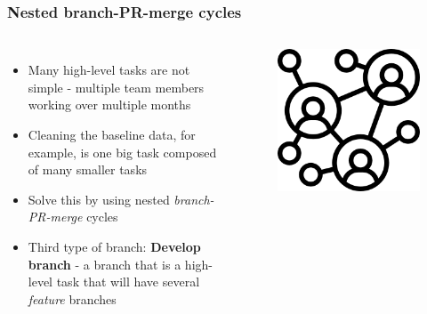 \documentclass[aspectratio=169]{beamer} %
\begin{document}
\begin{frame}
	\frametitle{Nested branch-PR-merge cycles}
	\begin{columns}[c]

		\begin{itemize}
			\setlength\itemsep{.5em}
			\item Many high-level tasks are not simple
			- multiple team members working over multiple months
			\item Cleaning the baseline data,
			for example, is one big task composed of many smaller tasks
			\item Solve this by using nested \textit{branch-PR-merge} cycles
			\item Third type of branch: \textbf{Develop branch}
			- a branch that is a high-level task that
			will have several \textit{feature} branches
		\end{itemize}


		\begin{figure}
			\centering
			\includegraphics[width=.65\textwidth]{./img/team-challenge.png}
		\end{figure}
	\end{columns}
\end{frame}
\end{document}
